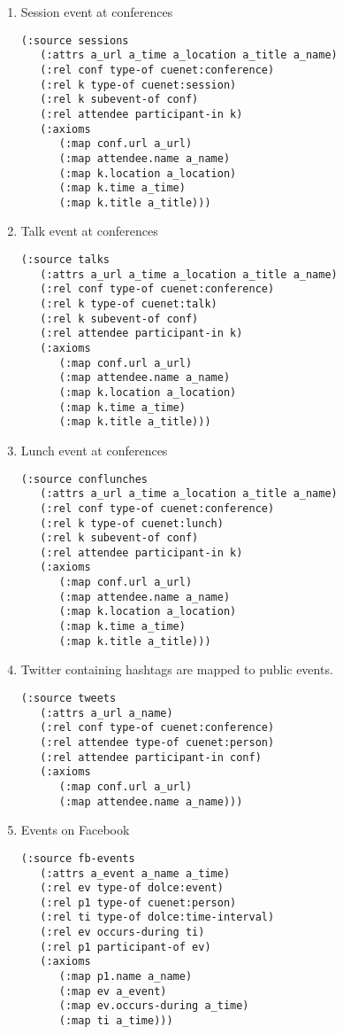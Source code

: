 \begin{enumerate}
\item Session event at conferences

\begin{verbatim}
(:source sessions
   (:attrs a_url a_time a_location a_title a_name)
   (:rel conf type-of cuenet:conference)
   (:rel k type-of cuenet:session)
   (:rel k subevent-of conf)
   (:rel attendee participant-in k)
   (:axioms
      (:map conf.url a_url)
      (:map attendee.name a_name)
      (:map k.location a_location)
      (:map k.time a_time)
      (:map k.title a_title)))
\end{verbatim}

\item Talk event at conferences

\begin{verbatim}
(:source talks
   (:attrs a_url a_time a_location a_title a_name)
   (:rel conf type-of cuenet:conference)
   (:rel k type-of cuenet:talk)
   (:rel k subevent-of conf)
   (:rel attendee participant-in k)
   (:axioms
      (:map conf.url a_url)
      (:map attendee.name a_name)
      (:map k.location a_location)
      (:map k.time a_time)
      (:map k.title a_title)))
\end{verbatim}

\item Lunch event at conferences

\begin{verbatim}
(:source conflunches
   (:attrs a_url a_time a_location a_title a_name)
   (:rel conf type-of cuenet:conference)
   (:rel k type-of cuenet:lunch)
   (:rel k subevent-of conf)
   (:rel attendee participant-in k)
   (:axioms
      (:map conf.url a_url)
      (:map attendee.name a_name)
      (:map k.location a_location)
      (:map k.time a_time)
      (:map k.title a_title)))
\end{verbatim}

\item Twitter containing hashtags are mapped to public events.

\begin{verbatim}
(:source tweets
   (:attrs a_url a_name)
   (:rel conf type-of cuenet:conference)
   (:rel attendee type-of cuenet:person)
   (:rel attendee participant-in conf)
   (:axioms
      (:map conf.url a_url)
      (:map attendee.name a_name)))
\end{verbatim}

\item Events on Facebook

\begin{verbatim}
(:source fb-events
   (:attrs a_event a_name a_time)
   (:rel ev type-of dolce:event)
   (:rel p1 type-of cuenet:person)
   (:rel ti type-of dolce:time-interval)
   (:rel ev occurs-during ti)
   (:rel p1 participant-of ev)
   (:axioms
      (:map p1.name a_name)
      (:map ev a_event)
      (:map ev.occurs-during a_time)
      (:map ti a_time)))
\end{verbatim}


\end{enumerate}